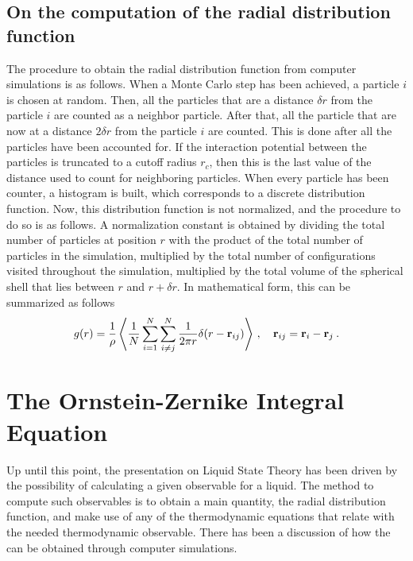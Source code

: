 \subsection{On the computation of the radial distribution function}
The procedure to obtain the radial distribution function from computer simulations is as
follows. When a Monte Carlo step has been achieved, a particle $i$ is chosen at random.
Then, all the particles that are a distance $\delta r$ from the particle $i$ are counted
as a neighbor particle. After that, all the particle that are now at a distance
$2 \delta r$ from the particle $i$ are counted. This is done after all the particles
have been accounted for. If the interaction potential between the particles is truncated
to a cutoff radius $r_c$, then this is the last value of the distance used to count
for neighboring particles. When every particle has been counter, a histogram is built,
which corresponds to a discrete distribution function. Now, this distribution function is
not normalized, and the procedure to do so is as follows. A normalization constant is 
obtained by dividing the total number of particles at position $r$ with the product
of the total number of particles in the simulation, multiplied by the total number of
configurations visited throughout the simulation, multiplied by the total volume of the
spherical shell that lies between $r$ and $r + \delta r$.
In mathematical form, this can be summarized as follows
\begin{equation}
    g(r)=\frac{1}{\rho} \left\langle \frac{1}{N} \sum_{i=1}^{N} \sum_{i \neq j}^{N} 
    \frac{1}{2 \pi r} \delta (r - \mathbf{r}_{ij}) \right\rangle
    \, , \quad
    \mathbf{r}_{ij}=\mathbf{r}_{i} - \mathbf{r}_{j} \: .
    \label{eq:rdf-simulation}
\end{equation}

\section{The Ornstein-Zernike Integral Equation}
Up until this point, the presentation on Liquid State Theory has been driven by the
possibility of calculating a given observable for a liquid. The method to compute such
observables is to obtain a main quantity, the radial distribution function, and
make use of any of the thermodynamic equations that relate \rdf with the needed
thermodynamic observable. There has been a discussion of how the \rdf can be obtained
through computer simulations.